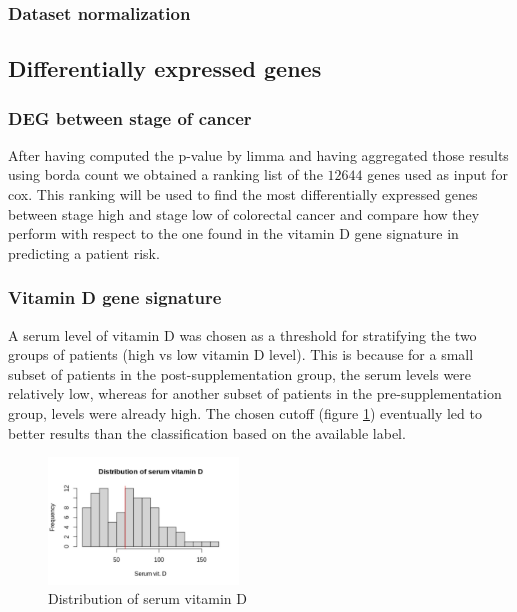 \documentclass[fleqn,10pt]{SelfArx} %
\begin{document}
		\subsubsection{Dataset normalization}

	\subsection{Differentially expressed genes}

		\subsubsection{DEG between stage of cancer}
		After having computed the p-value by limma and having aggregated those results using borda count we obtained a ranking list of the $12644$ genes used as input for cox.
		This ranking will be used to find the most differentially expressed genes between stage high and stage low of colorectal cancer and compare how they perform with respect to the one found in the vitamin D gene signature in predicting a patient risk.

		\subsubsection{Vitamin D gene signature}
		A serum level of vitamin D was chosen as a threshold for stratifying the two groups of patients (high vs low vitamin D level). This is because for a small subset of patients in the post-supplementation group, the serum levels were relatively low, whereas for another subset of patients in the pre-supplementation group, levels were already high. The chosen cutoff (figure \ref{fig:serum_level}) eventually led to better results than the classification based on the available label.

		\begin{figure}[ht]
			\includegraphics[width=0.45\textwidth]{figures/serum_level.png}
			\caption{Distribution of serum vitamin D}
			\label{fig:serum_level}
		\end{figure}
\end{document}
